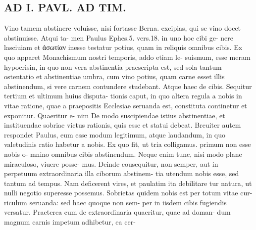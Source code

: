 \documentclass{article}
\begin{document}
\begin{pages}
\section*{AD I. PAVL. AD TIM. }
\marginpar{[ p.300 ]}Vino tamem abstinere voluisse, nisi fortasse Berna. excipias, qui se vino docet abstinuisse. Atqui ta- men Paulus Ephes.5. vers.18. in uno hoc cibi ge- nere lasciuiam et ἀσωτίαν inesse testatur potius, quam in reliquis omnibus cibis. Ex quo apparet Monachismum nostri temporis, addo etiam le- suismum, esse meram hypocrisin, in quo non vera abstinentia praescripta est, sed sola tantum ostentatio et abstinentiae umbra, cum vino potius, quam carne esset illis abstinendum, si vere carnem contundere studebant. Atque haec de cibis. Sequitur tertium et ultimum huius disputa- tionis caput, in quo altera regula a nobis in vitae ratione, quae a praepositis Ecclesiae seruanda est, constituta continetur et exponitur. Quaeritur e- nim De modo suscipiendae istius abstinentiae, et instituendae sobriae victus rationis, quis esse et statui debeat. Breuiter autem respondet Paulus, eum esse modum legitimum, atque laudandum, in quo valetudinis ratio habetur a nobis. Ex quo fit, ut tria colligamus. primum non esse nobis o- mnino omnibus cibis abstinendum. Neque enim tunc, nisi modo plane miraculoso, viuere posse- mus. Deinde cousequitur, non semper, aut in perpetuum extraordinaria illa ciborum abstinem- tia utendum nobis esse, sed tantum ad tempus. Nam deficerent vires, et paulatim ita debilitare tur natura, ut nulli negotio superesse possemus. Sobrietas quidem nobis est per totum vitae cur- riculum seruanda: sed haec quoque non sem- per in iisdem cibis fugiendis versatur. Praeterea cum de extraordinaria quaeritur, quae ad doman- dum magnum carnis impetum adhibetur, ea cer- 

\end{pages}
\end{document}
